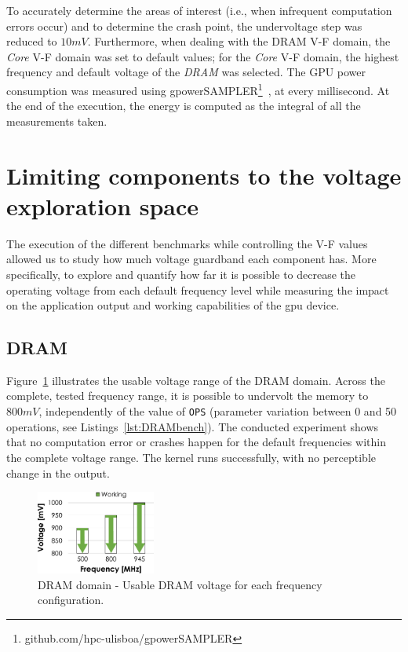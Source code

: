 To accurately determine the areas of interest (i.e., when infrequent computation errors occur) and to determine the crash point, the undervoltage step was reduced to $10mV$. Furthermore, when dealing with the \acrshort{DRAM} V-F domain, the \textit{Core} V-F domain was set to default values; for the \textit{Core} V-F domain, the highest frequency and default voltage of the \textit{DRAM} was selected. The GPU power consumption was measured using gpowerSAMPLER\footnote{github.com/hpc-ulisboa/gpowerSAMPLER}~\cite{guerreiro_gpgpu_2018}, at every millisecond. At the end of the execution, the energy is computed as the integral of all the measurements taken. 

\section{Limiting components to the voltage exploration space}
\label{sec:limiting_components}

The execution of the different benchmarks while controlling the V-F values allowed us to study how much voltage guardband each component has. More specifically, to explore and quantify how far it is possible to decrease the operating voltage from each default frequency level while measuring the impact on the application output and working capabilities of the \acrshort{gpu} device. 


\subsection{DRAM}

Figure~\ref{fig:DRAM_guardband} illustrates the usable voltage range of the DRAM domain. Across the complete, tested frequency range, it is possible to undervolt the memory to $800mV$, independently of the value of \texttt{OPS} (parameter variation between 0 and 50 operations, see Listings~\ref{lst:DRAMbench}).
The conducted experiment shows that no computation error or crashes happen for the default frequencies within the complete voltage range. The kernel runs successfully, with no perceptible change in the output.


\begin{figure}[htb]
  \centering
  \includegraphics[width=0.35\textwidth]{Figures/GPU_characterization/DRAM_Guardband.pdf}
  \caption{DRAM domain - Usable DRAM voltage for each frequency configuration.}
  \label{fig:DRAM_guardband}
\end{figure}

